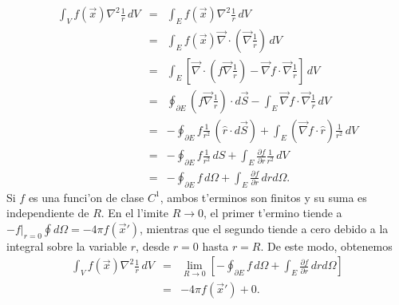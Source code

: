 \begin{eqnarray}
  \int_V f(\vec{x})\nabla^2\frac 1r\, dV &=&
  \int_E f(\vec{x})\nabla^2\frac 1r\, dV \\
&=&\int_E f(\vec
x)\vec\nabla\cdot\left(\vec\nabla\frac {1}{r}\right) \, dV\\
&=&
\int_E\left[\vec\nabla\cdot\left(f\vec\nabla\frac{1}{r}\right)-\vec\nabla
f\cdot \vec\nabla\frac{1}{r}\right]\,
dV\\
&=& \oint_{\partial E}\left(f\vec\nabla\frac{1}{r}\right)\cdot
d\vec{S}
-\int_E \vec\nabla f\cdot \vec\nabla\frac{1}{r}\, dV\\
&=& -\oint_{\partial E}f\frac{1}{r^2}\, (\hat{r}\cdot d\vec{S})
+\int_E (\vec\nabla f\cdot\hat{r})\frac{1}{r^2}\, dV\\
&=& -\oint_{\partial E}f\frac{1}{r^2}\, dS
+\int_E \frac{\partial f}{\partial r}\frac{1}{r^2}\, dV \\
&=& -\oint_{\partial E}f\, d\Omega
+\int_E \frac{\partial f}{\partial r}\, drd\Omega .
\end{eqnarray}
Si $f$ es una funci'on de clase $C^1$, ambos t'erminos son finitos y su suma es
independiente de $R$. En el l'imite $R\rightarrow 0$, el primer t'ermino tiende
a $-f|_{r=0}\oint d\Omega=-4\pi f(\vec x')$, mientras que el segundo tiende a
cero debido a la integral sobre la variable $r$, desde $r=0$ hasta $r=R$. De
este modo, obtenemos
\begin{eqnarray}
  \int_V f(\vec{x})\nabla^2\frac 1r\, dV &=& \lim_{R\rightarrow
0}\left[-\oint_{\partial E}f\, d\Omega+\int_E \frac{\partial f}{\partial r}\,
drd\Omega \right]\\
&=& -4\pi f(\vec x')+0.
\end{eqnarray}
